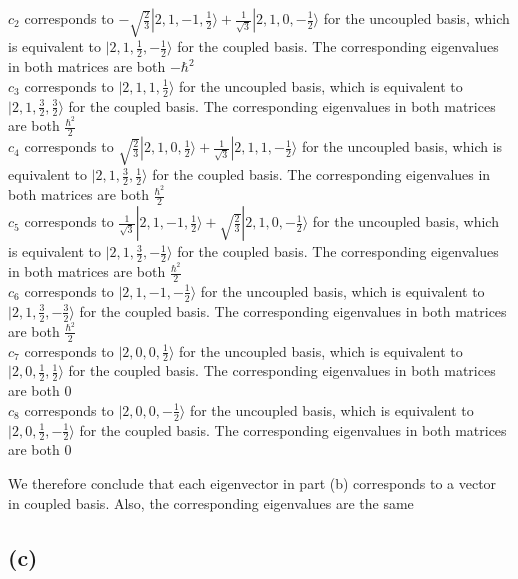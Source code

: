 \documentclass[12pt]{article}
\begin{document}
\begin{spacing}{2.0}
$c_2$ corresponds to $-\sqrt{\frac{2}{3}} |2,1,-1,\frac{1}{2} \rangle + \frac{1}{\sqrt{3}} |2,1,0,-\frac{1}{2}\rangle$ for the uncoupled basis, which is equivalent to $|2,1,\frac{1}{2},-\frac{1}{2} \rangle$ for the coupled basis. The corresponding eigenvalues in both matrices are both $-\hbar ^2$\\

$c_3$ corresponds to $ |2,1,1,\frac{1}{2} \rangle$ for the uncoupled basis, which is equivalent to $|2,1,\frac{3}{2},\frac{3}{2} \rangle$ for the coupled basis. The corresponding eigenvalues in both matrices are both $\frac{\hbar^2}{2}$\\

$c_4$ corresponds to $\sqrt{\frac{2}{3}} |2,1,0,\frac{1}{2} \rangle + \frac{1}{\sqrt{3}}|2,1,1,-\frac{1}{2}\rangle$ for the uncoupled basis, which is equivalent to $|2,1,\frac{3}{2},\frac{1}{2} \rangle$ for the coupled basis. The corresponding eigenvalues in both matrices are both $\frac{\hbar^2}{2}$\\

$c_5$ corresponds to $\frac{1}{\sqrt{3}} |2,1,-1,\frac{1}{2} \rangle + \sqrt{\frac{2}{3}} |2,1,0,-\frac{1}{2}\rangle$ for the uncoupled basis, which is equivalent to $|2,1,\frac{3}{2},-\frac{1}{2} \rangle$ for the coupled basis. The corresponding eigenvalues in both matrices are both $\frac{\hbar^2}{2}$\\

$c_6$ corresponds to $ |2,1,-1,-\frac{1}{2} \rangle$ for the uncoupled basis, which is equivalent to $|2,1,\frac{3}{2},-\frac{3}{2} \rangle$ for the coupled basis. The corresponding eigenvalues in both matrices are both $\frac{\hbar^2}{2}$\\

$c_7$ corresponds to $|2,0,0,\frac{1}{2} \rangle$ for the uncoupled basis, which is equivalent to $|2,0,\frac{1}{2},\frac{1}{2} \rangle$ for the coupled basis. The corresponding eigenvalues in both matrices are both $0$\\

$c_8$ corresponds to $|2,0,0,-\frac{1}{2} \rangle$ for the uncoupled basis, which is equivalent to $|2,0,\frac{1}{2},-\frac{1}{2} \rangle$ for the coupled basis. The corresponding eigenvalues in both matrices are both $0$

We therefore conclude that each eigenvector in part (b) corresponds to a vector in coupled basis. Also, the corresponding eigenvalues are the same

\subsection*{(c)}


\end{spacing}
\end{document}
